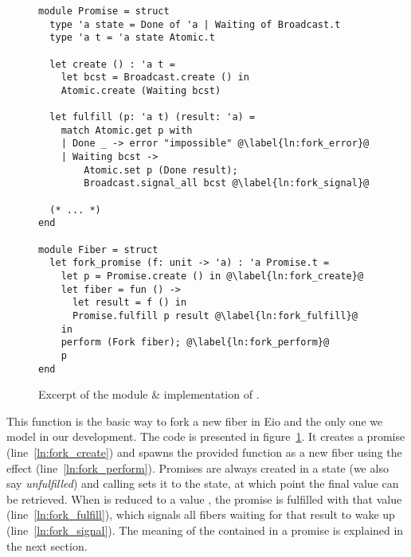 \subsubsection{}
\label{sec:sched-impl-fork}

\begin{figure}[ht]
  \begin{verbatim}
module Promise = struct
  type 'a state = Done of 'a | Waiting of Broadcast.t
  type 'a t = 'a state Atomic.t

  let create () : 'a t = 
    let bcst = Broadcast.create () in
    Atomic.create (Waiting bcst)

  let fulfill (p: 'a t) (result: 'a) = 
    match Atomic.get p with
    | Done _ -> error "impossible" @\label{ln:fork_error}@ 
    | Waiting bcst ->
        Atomic.set p (Done result);
        Broadcast.signal_all bcst @\label{ln:fork_signal}@ 

  (* ... *)
end
  
module Fiber = struct
  let fork_promise (f: unit -> 'a) : 'a Promise.t =
    let p = Promise.create () in @\label{ln:fork_create}@ 
    let fiber = fun () ->
      let result = f () in
      Promise.fulfill p result @\label{ln:fork_fulfill}@ 
    in
    perform (Fork fiber); @\label{ln:fork_perform}@
    p
end
  \end{verbatim}
  \caption{Excerpt of the  module \& implementation of .}
  \label{fig:sched-impl-fork}
\end{figure}

This function is the basic way to fork a new fiber in Eio and the only one we model in our development.
The code is presented in figure~\ref{fig:sched-impl-fork}.
It creates a promise (line~\ref{ln:fork_create}) and spawns the provided function as a new fiber using the \efork{} effect (line~\ref{ln:fork_perform}).
Promises are always created in a  state (we also say \emph{unfulfilled}) and calling  sets it to the  state, at which point the final value can be retrieved.
When  is reduced to a value , the promise is fulfilled with that value (line~\ref{ln:fork_fulfill}), which signals all fibers waiting for that result to wake up (line~\ref{ln:fork_signal}).
The meaning of the  contained in a promise is explained in the next section.

\subsubsection{}
\label{sec:sched-impl-await}

